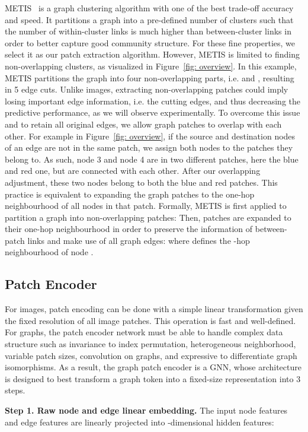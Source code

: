 \documentclass{article}
\begin{document}
METIS~\citep{karypis1998metis} is a graph clustering algorithm with one of the best trade-off accuracy and speed. It partitions a graph into a pre-defined number of clusters such that the number of within-cluster links is much higher than between-cluster links in order to better capture good community structure. For these fine properties, we select it as our patch extraction algorithm. 
However, METIS is limited to finding non-overlapping clusters, as visualized in Figure~\ref{fig: overview}. In this example, METIS partitions the graph into four non-overlapping parts, i.e.  and , resulting in 5 edge cuts. Unlike images, extracting non-overlapping patches could imply losing important edge information, i.e. the cutting edges, and thus decreasing the predictive performance, as we will observe experimentally. To overcome this issue and to retain all original edges, we allow graph patches to overlap with each other. For example in Figure~\ref{fig: overview}, if the source and destination nodes of an edge are not in the same patch, we assign both nodes to the patches they belong to. As such, node 3 and node 4 are in two different patches, here the blue and red one, but are connected with each other. After our overlapping adjustment, these two nodes belong to both the blue and red patches. This practice is equivalent to expanding the graph patches to the one-hop neighbourhood of all nodes in that patch. Formally, METIS is first applied to partition a graph into  non-overlapping patches: 
Then, patches are expanded to their one-hop neighbourhood in order to preserve the information of between-patch links and make use of all graph edges:  where  defines the -hop neighbourhood of node .


\subsection{Patch Encoder}

For images, patch encoding can be done with a simple linear transformation given the fixed resolution of all image patches. This operation is fast and well-defined. For graphs, the patch encoder network must be able to handle complex data structure such as invariance to index permutation, heterogeneous neighborhood, variable patch sizes, convolution on graphs, and expressive to differentiate graph isomorphisms. As a result, the graph patch encoder is a GNN, whose architecture is designed to best transform a graph token  into a fixed-size representation  into 3 steps.


\textbf{Step 1. Raw node and edge linear embedding.} The input node features  and edge features  are linearly projected into -dimensional hidden features:
\end{document}
